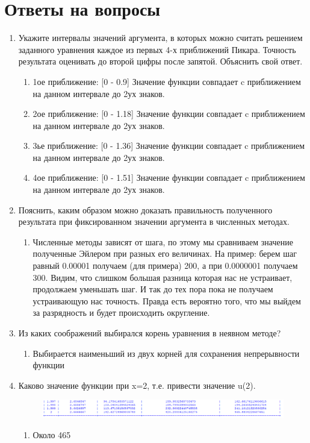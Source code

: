 \documentclass[12pt,a4paper]{scrartcl}
\begin{document}
	\section{Ответы на вопросы}
	\begin{enumerate}
		\item Укажите интервалы значений аргумента, в которых можно считать решением заданного уравнения каждое из первых 4-х  приближений Пикара. Точность результата оценивать до второй цифры после запятой. Объяснить свой ответ.
		\begin{enumerate}
			\item 1ое приближение: [0 - 0.9] Значение функции совпадает c приближением на данном интервале до 2ух знаков. 
			\item 2ое приближение: [0 - 1.18] Значение функции совпадает c приближением на данном интервале до 2ух знаков. 
			\item 3ье приближение: [0 - 1.36] Значение функции совпадает c приближением на данном интервале до 2ух знаков.
			\item 4ое приближение: [0 - 1.51] Значение функции совпадает c приближением на данном интервале до 2ух знаков.
		\end{enumerate}
		\item Пояснить, каким образом можно доказать правильность полученного результата при фиксированном значении аргумента  в численных методах. 
		\begin{enumerate}
			\item Численные методы зависят от шага, по этому мы сравниваем значение полученные Эйлером при разных его величинах. На пример: берем шаг равный 0.00001 получаем (для примера) 200, а при 0.0000001 получаем 300. Видим, что слишком большая разница которая нас не устраивает, продолжаем уменьшать шаг. И так до тех пора пока не получаем устраивающую нас точность. Правда есть вероятно того, что мы выйдем за разрядность и будет происходить округление.
		\end{enumerate}
		\item Из каких соображений выбирался корень уравнения в неявном методе?
		\begin{enumerate}
			\item Выбирается наименьший из двух корней для сохранения непрерывности функции
		\end{enumerate}
		\item Каково значение функции при x=2, т.е. привести значение u(2).
		\begin{figure}
			\centering
			\includegraphics[width=\linewidth]{4}
			\caption{}
			\label{fig:4}
		\end{figure}
		
		\begin{enumerate}
			\item Около 465
		\end{enumerate}
	\end{enumerate}
\end{document}
